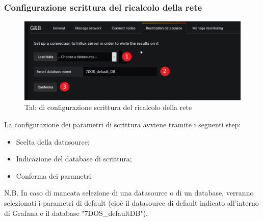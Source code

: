 \subsubsection{Configurazione scrittura del ricalcolo della rete}
\begin{figure} [H]
	\centering
	\includegraphics[scale=0.55]{Img/setds} 
	\caption{Tab di configurazione scrittura del ricalcolo della rete} \label{} 
\end{figure} 
La configurazione dei parametri di scrittura avviene tramite i seguenti step:
\begin{itemize}
	\item Scelta della datasource;
	\item Indicazione del database di scrittura;
	\item Conferma dei parametri.
\end{itemize}

N.B. In caso di mancata selezione di una datasource o di un database, verranno selezionati i parametri di default (cioè il datasource di default indicato all'interno di Grafana e il database "7DOS\_defaultDB").